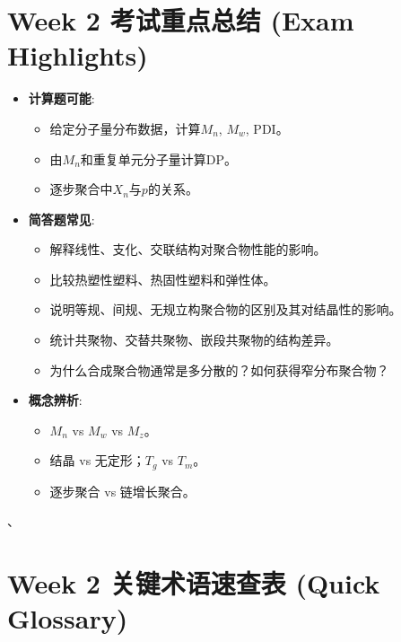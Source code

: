 \documentclass[12pt,a4paper]{ctexart}
\begin{document}
\section{Week 2 考试重点总结 (Exam Highlights)}
\begin{itemize}
    \item \textbf{计算题可能}: 
    \begin{itemize}
        \item 给定分子量分布数据，计算$M_n$, $M_w$, PDI。
        \item 由$M_n$和重复单元分子量计算DP。
        \item 逐步聚合中$X_n$与$p$的关系。
    \end{itemize}
    \item \textbf{简答题常见}:
    \begin{itemize}
        \item 解释线性、支化、交联结构对聚合物性能的影响。
        \item 比较热塑性塑料、热固性塑料和弹性体。
        \item 说明等规、间规、无规立构聚合物的区别及其对结晶性的影响。
        \item 统计共聚物、交替共聚物、嵌段共聚物的结构差异。
        \item 为什么合成聚合物通常是多分散的？如何获得窄分布聚合物？
    \end{itemize}
    \item \textbf{概念辨析}:
    \begin{itemize}
        \item $M_n$ vs $M_w$ vs $M_z$。
        \item 结晶 vs 无定形；$T_g$ vs $T_m$。
        \item 逐步聚合 vs 链增长聚合。
    \end{itemize}
\end{itemize}、
\section{Week 2 关键术语速查表 (Quick Glossary)}
\end{document}

